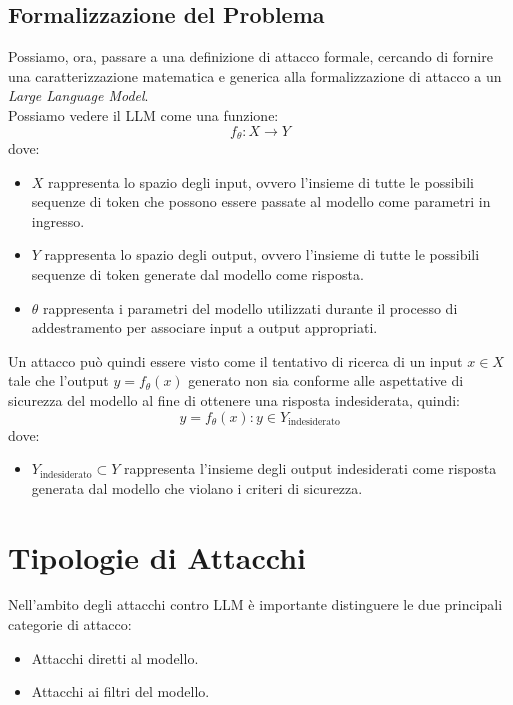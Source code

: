 \subsection{Formalizzazione del Problema}
Possiamo, ora, passare a una definizione di attacco formale, cercando di fornire una caratterizzazione matematica e generica alla formalizzazione di attacco a un \emph{Large Language Model}.\\
Possiamo vedere il LLM come una funzione:
\[f_\theta : X \rightarrow Y\]
dove:\\
\begin{itemize}
    \item \(X\) rappresenta lo spazio degli input, ovvero l'insieme di tutte le possibili sequenze di token che possono essere passate al modello come parametri in ingresso.
    \item \(Y\) rappresenta lo spazio degli output, ovvero l'insieme di tutte le possibili sequenze di token generate dal modello come risposta.
    \item \(\theta\) rappresenta i parametri del modello utilizzati durante il processo di addestramento per associare input a output appropriati.
\end{itemize}
Un attacco pu\`o quindi essere visto come il tentativo di ricerca di un input \(x \in X\) tale che l'output \(y = f_\theta(x)\) generato non sia conforme alle aspettative di sicurezza del modello al fine di ottenere una risposta indesiderata, quindi: \[y = f_\theta(x) : y \in Y_\text{indesiderato}\]
dove:
\begin{itemize}
    \item \(Y_\text{indesiderato}\subset Y\) rappresenta l'insieme degli output indesiderati come risposta generata dal modello che violano i criteri di sicurezza.
\end{itemize}

\section{Tipologie di Attacchi}
Nell'ambito degli attacchi contro LLM \`e importante distinguere le due principali categorie di attacco: 
\begin{itemize}
    \item Attacchi diretti al modello.
    \item Attacchi ai filtri del modello.
\end{itemize}

